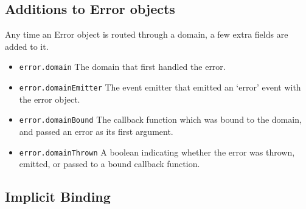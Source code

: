 \begin{Shaded}
\begin{Highlighting}[]
    \NormalTok{(}\NormalTok{() \{}
    \NormalTok{\});}
  \NormalTok{\});}
\NormalTok{\}}

 
  \NormalTok{(}\NormalTok{) \{}
     \NormalTok{:}
      \NormalTok{(}\NormalTok{() \{}
        \NormalTok{();}
      \NormalTok{\});}
      \NormalTok{;}
    \NormalTok{:}
      \NormalTok{(}\NormalTok{);}
  \NormalTok{\}}
\NormalTok{\}}
\end{Highlighting}
\end{Shaded}

\subsection{Additions to Error
objects}\label{additions-to-error-objects}

Any time an Error object is routed through a domain, a few extra fields
are added to it.

\begin{itemize}
\itemsep1pt\parskip0pt
\item
  \texttt{error.domain} The domain that first handled the error.
\item
  \texttt{error.domainEmitter} The event emitter that emitted an `error'
  event with the error object.
\item
  \texttt{error.domainBound} The callback function which was bound to
  the domain, and passed an error as its first argument.
\item
  \texttt{error.domainThrown} A boolean indicating whether the error was
  thrown, emitted, or passed to a bound callback function.
\end{itemize}

\subsection{Implicit Binding}\label{implicit-binding}

